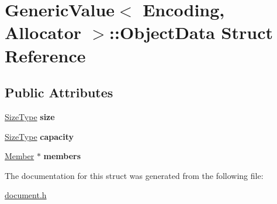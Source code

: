 \hypertarget{a00227}{}\section{Generic\+Value$<$ Encoding, Allocator $>$\+:\+:Object\+Data Struct Reference}
\label{a00227}
\subsection*{Public Attributes}
\begin{DoxyCompactItemize}
\item 
\hyperlink{a00677_a5ed6e6e67250fadbd041127e6386dcb5}{Size\+Type} {\bfseries size}\hypertarget{a00227_a8aa09c430b245b9bb0745a1ab38201d5}{}\label{a00227_a8aa09c430b245b9bb0745a1ab38201d5}

\item 
\hyperlink{a00677_a5ed6e6e67250fadbd041127e6386dcb5}{Size\+Type} {\bfseries capacity}\hypertarget{a00227_a22b8d8b01d52db71471f0d4c990cb93b}{}\label{a00227_a22b8d8b01d52db71471f0d4c990cb93b}

\item 
\hyperlink{a00130_a7ccf27c44058b4c11c3efc6473afb886}{Member} $\ast$ {\bfseries members}\hypertarget{a00227_a108be865f16e4c028f2354b1474a1ec8}{}\label{a00227_a108be865f16e4c028f2354b1474a1ec8}

\end{DoxyCompactItemize}


The documentation for this struct was generated from the following file\+:\begin{DoxyCompactItemize}
\item 
\hyperlink{a00473}{document.\+h}\end{DoxyCompactItemize}

